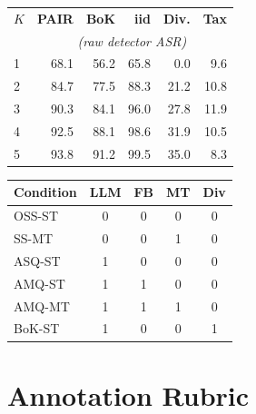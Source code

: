 \documentclass[11pt]{article}
\begin{document}
\vspace{0.5em}
\nolinenumbers
\noindent
\begin{minipage}{\columnwidth}
\centering
\small
{}
\label{tab:budget}
\vspace{0.3em}
\begin{tabular}{lrrrrr}
\toprule
\textbf{$K$} & \textbf{PAIR} & \textbf{BoK} & \textbf{iid} & \textbf{Div.} & \textbf{Tax} \\
 & \multicolumn{5}{c}{\scriptsize\textit{(raw detector ASR)}} \\
\midrule
1 & 68.1 & 56.2 & 65.8 & 0.0 & 9.6 \\
2 & 84.7 & 77.5 & 88.3 & 21.2 & 10.8 \\
3 & 90.3 & 84.1 & 96.0 & 27.8 & 11.9 \\
4 & 92.5 & 88.1 & 98.6 & 31.9 & 10.5 \\
5 & 93.8 & 91.2 & 99.5 & 35.0 & 8.3 \\
\bottomrule
\end{tabular}
\end{minipage}
\linenumbers

\vspace{1em}
\nolinenumbers
\noindent
\begin{minipage}{\columnwidth}
\centering
\small
{}
\label{tab:encoding}
\vspace{0.3em}
\begin{tabular}{lcccc}
\toprule
\textbf{Condition} & \textbf{LLM} & \textbf{FB} & \textbf{MT} & \textbf{Div} \\
\midrule
OSS-ST & 0 & 0 & 0 & 0 \\
SS-MT & 0 & 0 & 1 & 0 \\
ASQ-ST & 1 & 0 & 0 & 0 \\
AMQ-ST & 1 & 1 & 0 & 0 \\
AMQ-MT & 1 & 1 & 1 & 0 \\
BoK-ST & 1 & 0 & 0 & 1 \\
\bottomrule
\end{tabular}
\end{minipage}
\linenumbers

\section{Annotation Rubric}
\label{app:rubric}
\end{document}
